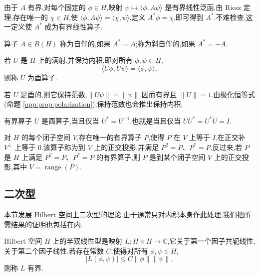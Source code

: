 由于 \(A\) 有界,对每个固定的 \(\phi\in H\),映射 \(\psi\mapsto\langle\phi,A\psi\rangle\) 是有界线性泛函.由 Riesz 定理,存在唯一的 \(\chi\in H\),使 \(\langle\phi,A\psi\rangle=\langle\chi,\psi\rangle\).定义 \(A^*\phi=\chi\),即可得到 \(A^*\).不难检查,这一定义使 \(A^*\) 成为有界线性算子.

\begin{definition}[自伴与斜自伴]\label{app:def:self-adjoint-bounded}
算子 \(A\in B(H)\) 称为自伴的,如果 \(A^*=A\);称为斜自伴的,如果 \(A^*=-A\).
\end{definition}

\begin{definition}[酉算子]\label{app:def:unitary}
若 \(U\) 是 \(H\) 上的满射,并保持内积,即对所有 \(\phi,\psi\in H\),
\[
\langle U\phi,U\psi\rangle=\langle\phi,\psi\rangle,
\]
则称 \(U\) 为酉算子.
\end{definition}

若 \(U\) 是酉的,则它保持范数,\(\|U\psi\|=\|\psi\|\),因而有界且 \(\|U\|=1\).由极化恒等式(命题 \ref{app:prop:polarization}),保持范数也会推出保持内积.

\begin{proposition}[酉算子的判别]\label{app:prop:unitary-characterization}
有界算子 \(U\) 是酉算子,当且仅当 \(U^*=U^{-1}\),也就是当且仅当 \(UU^*=U^*U=I\).
\end{proposition}

\begin{proposition}[正交投影]\label{app:prop:orthogonal-projection}
对 \(H\) 的每个闭子空间 \(V\),存在唯一的有界算子 \(P\),使得 \(P\) 在 \(V\) 上等于 \(I\),在正交补 \(V^\perp\) 上等于 \(0\).该算子称为到 \(V\) 上的正交投影,并满足 \(P^2=P\)、\(P^*=P\).反过来,若 \(P\) 是 \(H\) 上满足 \(P^2=P\)、\(P^*=P\) 的有界算子,则 \(P\) 是到某个闭子空间 \(V\) 上的正交投影,其中 \(V=\operatorname{range}(P)\).
\end{proposition}

\subsection{二次型}

本节发展 Hilbert 空间上二次型的理论.由于通常只对内积本身作此处理,我们把所需结果的证明也包括在内.

\begin{definition}[半双线性型]\label{app:def:sesquilinear}
Hilbert 空间 \(H\) 上的半双线性型是映射 \(L:H\times H\to\mathbb C\),它关于第一个因子共轭线性,关于第二个因子线性.若存在常数 \(C\),使得对所有 \(\phi,\psi\in H\),
\[
|L(\phi,\psi)|\le C\|\phi\|\|\psi\|,
\]
则称 \(L\) 有界.
\end{definition}


